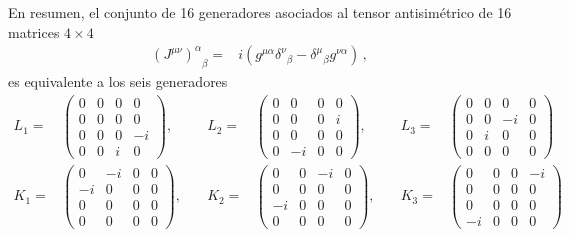 \begin{frame}
En resumen, el conjunto de 16 generadores asociados al tensor antisimétrico de 16 matrices $4\times4$
\begin{align}
  {\left(J^{\mu\nu}\right)^{\alpha}}_{\beta}  =  &i\left(g^{\mu\alpha}{\delta^\nu}_\beta-{\delta^\mu}_\beta g^{\nu\alpha}\right)\,,
\end{align}
es equivalente a los seis generadores
\begin{align}
  L_{1}=&  
  \begin{pmatrix}
0 & 0 & 0 & 0 \\
0 & 0 & 0 & 0 \\
0 & 0 & 0 & -i \\
0 & 0 & i & 0
  \end{pmatrix}, \quad &L_{2}=&
  \begin{pmatrix}
0 & 0 & 0 & 0 \\
0 & 0 & 0 & i \\
0 & 0 & 0 & 0 \\
0 & -i & 0 & 0
  \end{pmatrix},\quad& L_{3}=&
  \begin{pmatrix}
0 & 0 & 0 & 0 \\
0 & 0 & -i & 0 \\
0 & i & 0 & 0 \\
0 & 0 & 0 & 0
  \end{pmatrix} \nonumber\\
K_{1}=&\begin{pmatrix}
0 & -i & 0 & 0 \\
-i & 0 & 0 & 0 \\
0 & 0 & 0 & 0 \\
0 & 0 & 0 & 0
\end{pmatrix}, \quad &K_{2}=&\begin{pmatrix}
0 & 0 & -i & 0 \\
0 & 0 & 0 & 0 \\
-i & 0 & 0 & 0 \\
0 & 0 & 0 & 0
\end{pmatrix},\quad &K_{3}=&\begin{pmatrix}
0 & 0 & 0 & -i \\
0 & 0 & 0 & 0 \\
0 & 0 & 0 & 0 \\
-i & 0 & 0 & 0
\end{pmatrix}
\end{align}
\end{frame}

